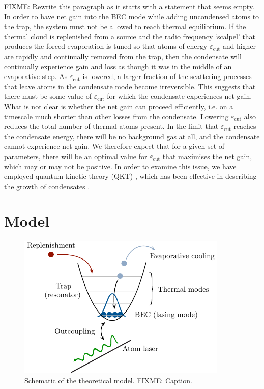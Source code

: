 FIXME: Rewrite this paragraph as it starts with a statement that seems empty. In order to have net gain into the BEC mode while adding uncondensed atoms to the trap, the system must not be allowed to reach thermal equilibrium. If the thermal cloud is replenished from a source and the radio frequency `scalpel' that produces the forced evaporation is tuned so that atoms of energy $\varepsilon_\text{cut}$ and higher are rapidly and continually removed from the trap, then the condensate will continually experience gain and loss as though it was in the middle of an evaporative step. As $\varepsilon_\text{cut}$ is lowered, a larger fraction of the scattering processes that leave atoms in the condensate mode become irreversible. This suggests that there must be some value of $\varepsilon_\text{cut}$ for which the condensate experiences net gain. What is not clear is whether the net gain can proceed efficiently, i.e. on a timescale much shorter than other losses from the condensate. Lowering $\varepsilon_\text{cut}$ also reduces the total number of thermal atoms present. In the limit that $\varepsilon_\text{cut}$ reaches the condensate energy, there will be no background gas at all, and the condensate cannot experience net gain. We therefore expect that for a given set of parameters, there will be an optimal value for $\varepsilon_\text{cut}$ that maximises the net gain, which may or may not be positive. In order to examine this issue, we have employed quantum kinetic theory (QKT) \citep{Gardiner:1997tz,Jaksch:1997ug,Gardiner:1998wx,Jaksch:1998sj,Gardiner:2000ug,Lee:2000vs,Davis:2000vn}, which has been effective in describing the growth of condensates \citep{Davis:2000vn}.


\section{Model}
\label{KineticTheory:Model}

\begin{figure}
    \centering
        \includegraphics[width=10cm]{QKTModel2}
    \caption{Schematic of the theoretical model. FIXME: Caption.}
    \label{KineticTheory:QKTModel}
\end{figure}

